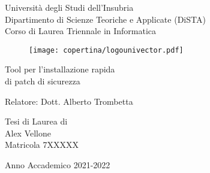 \begin{titlepage}
  \begin{center}
    \begin{large}
      {\fontsize{20}{18}\selectfont\vspace*{0.50cm}Universit\`a degli Studi dell'Insubria}\\
      Dipartimento di Scienze Teoriche e Applicate (DiSTA)\\
      Corso di Laurea Triennale in Informatica
    \end{large}

    \vspace{1cm}
    \begin{figure}[h]
      \begin{center}
        \texttt{[image: copertina/logounivector.pdf]}
      \end{center}
    \end{figure}

      {
        \fontsize{26}{26}\selectfont\par\vspace*{0.75cm}
        Tool per l'installazione rapida\\
        \vspace{.15em}di patch di sicurezza
      }
    \par

    \vfill
    \vspace{3cm}
    \begin{large}
      Relatore: Dott. Alberto Trombetta

      \vspace{1.0cm}
      Tesi di Laurea di\\
      Alex Vellone\\
      Matricola 7XXXXX\\
      \vspace{0.5cm}

    \end{large}

    Anno Accademico 2021-2022

  \end{center}
\end{titlepage}
